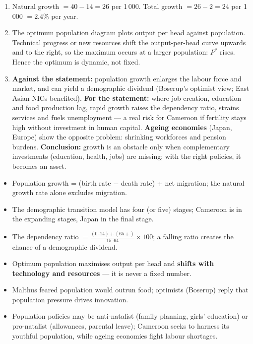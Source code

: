 \documentclass[11pt]{article}
\begin{document}
\begin{corrige}[Exercise 1]
\begin{enumerate}
\item Natural growth $= 40 - 14 = 26$ per 1\,000. Total growth $= 26 - 2 = 24$ per 1\,000 $= 2.4\%$ per year.
\item The optimum population diagram plots output per head against population. Technical progress or new resources shift the output-per-head curve upwards and to the right, so the maximum occurs at a larger population: $P^{*}$ rises. Hence the optimum is dynamic, not fixed.
\item \textbf{Against the statement:} population growth enlarges the labour force and market, and can yield a demographic dividend (Boserup's optimist view; East Asian NICs benefited). \textbf{For the statement:} where job creation, education and food production lag, rapid growth raises the dependency ratio, strains services and fuels unemployment — a real risk for Cameroon if fertility stays high without investment in human capital. \textbf{Ageing economies} (Japan, Europe) show the opposite problem: shrinking workforces and pension burdens. \textbf{Conclusion:} growth is an obstacle only when complementary investments (education, health, jobs) are missing; with the right policies, it becomes an asset.
\end{enumerate}
\end{corrige}

\begin{aretenir}
\begin{itemize}
\item Population growth = (birth rate $-$ death rate) + net migration; the natural growth rate alone excludes migration.
\item The demographic transition model has four (or five) stages; Cameroon is in the expanding stages, Japan in the final stage.
\item The dependency ratio $= \frac{(0\text{--}14) + (65+)}{15\text{--}64} \times 100$; a falling ratio creates the chance of a demographic dividend.
\item Optimum population maximises output per head and \textbf{shifts with technology and resources} — it is never a fixed number.
\item Malthus feared population would outrun food; optimists (Boserup) reply that population pressure drives innovation.
\item Population policies may be anti-natalist (family planning, girls' education) or pro-natalist (allowances, parental leave); Cameroon seeks to harness its youthful population, while ageing economies fight labour shortages.
\end{itemize}
\end{aretenir}
\end{document}
